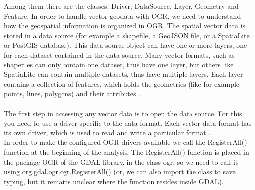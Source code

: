 \documentclass {article}
\begin{document}
 Among them there are the classes: Driver, DataSource, Layer, Geometry and Feature. In order to handle vector geodata with OGR, we need to understand how the geospatial information is organized in OGR. The spatial vector data is stored in a data source (for example a shapefile, a GeoJSON file, or a SpatiaLite or PostGIS database). This data source object can have one or more layers, one for each dataset contained in the data source. Many vector formats, such as shapefiles can only contain one dataset, thus have one layer, but others like SpatiaLite can contain multiple datasets, thus have multiple layers. Each layer contains a collection of features, which holds the geometries (like for example points, lines, polygons) and their attributes  \cite{garrard_geoprocessing_2016}. \\
\\
The first step in accessing any vector data is to open the data source. For this you need to use a driver specific to the data format. Each vector data format has its own driver, which is used to read and write a particular format \cite{garrard_geoprocessing_2016}.\\
In order to make the configured OGR drivers available we call the RegisterAll() function at the beginning of the analysis. The RegisterAll() function is placed in the package OGR of the GDAL library, in the class ogr, so we need to call it using org.gdal.ogr.ogr.RegisterAll() (or, we can also import the class to save typing, but it remains unclear where the function resides inside GDAL).                     
\end{document}
